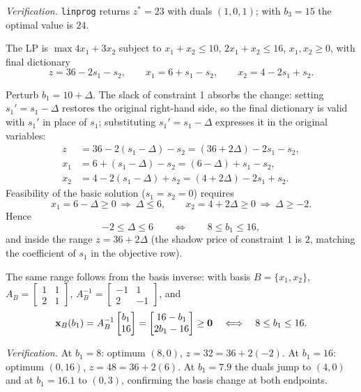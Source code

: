 \emph{Verification.} \texttt{linprog} returns $z^* = 23$ with duals $(1, 0, 1)$; with $b_3 = 15$ the optimal value is $24$.


The LP is $\max 4x_1 + 3x_2$ subject to $x_1 + x_2 \le 10$, $2x_1 + x_2 \le 16$, $x_1, x_2 \ge 0$, with final dictionary
\[
z = 36 - 2s_1 - s_2, \qquad x_1 = 6 + s_1 - s_2, \qquad x_2 = 4 - 2s_1 + s_2 .
\]

Perturb $b_1 = 10 + \Delta$. The slack of constraint 1 absorbs the change: setting $s_1' = s_1 - \Delta$ restores the original right-hand side, so the final dictionary is valid with $s_1'$ in place of $s_1$; substituting $s_1' = s_1 - \Delta$ expresses it in the original variables:
\[
\begin{aligned}
z   &= 36 - 2(s_1 - \Delta) - s_2 = (36 + 2\Delta) - 2s_1 - s_2, \\
x_1 &= 6 + (s_1 - \Delta) - s_2 = (6 - \Delta) + s_1 - s_2, \\
x_2 &= 4 - 2(s_1 - \Delta) + s_2 = (4 + 2\Delta) - 2s_1 + s_2 .
\end{aligned}
\]
Feasibility of the basic solution ($s_1 = s_2 = 0$) requires
\[
x_1 = 6 - \Delta \ge 0 \ \Rightarrow\ \Delta \le 6,
\qquad
x_2 = 4 + 2\Delta \ge 0 \ \Rightarrow\ \Delta \ge -2 .
\]
Hence
\[
-2 \le \Delta \le 6
\qquad\Longleftrightarrow\qquad
\boxed{8 \le b_1 \le 16},
\]
and inside the range $z = 36 + 2\Delta$ (the shadow price of constraint 1 is $2$, matching the coefficient of $s_1$ in the objective row).

The same range follows from the basis inverse: with basis $B = \{x_1, x_2\}$, $A_B = \begin{bmatrix} 1 & 1 \\ 2 & 1 \end{bmatrix}$, $A_B^{-1} = \begin{bmatrix} -1 & 1 \\ 2 & -1 \end{bmatrix}$, and
\[
\mathbf{x}_B(b_1) = A_B^{-1}\begin{bmatrix} b_1 \\ 16 \end{bmatrix} = \begin{bmatrix} 16 - b_1 \\ 2b_1 - 16 \end{bmatrix} \ge \mathbf{0}
\quad\Longleftrightarrow\quad 8 \le b_1 \le 16 .
\]

\emph{Verification.} At $b_1 = 8$: optimum $(8, 0)$, $z = 32 = 36 + 2(-2)$. At $b_1 = 16$: optimum $(0, 16)$, $z = 48 = 36 + 2(6)$. At $b_1 = 7.9$ the duals jump to $(4, 0)$ and at $b_1 = 16.1$ to $(0, 3)$, confirming the basis change at both endpoints.

